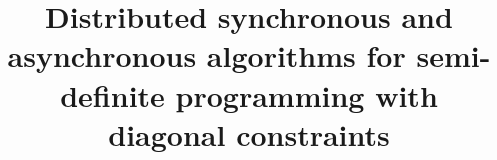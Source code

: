 \documentclass[journal]{IEEEtran}
\begin{document}
%
\title{Distributed synchronous and asynchronous algorithms for semi-definite programming with diagonal constraints}
%
%
%
\end{document}
